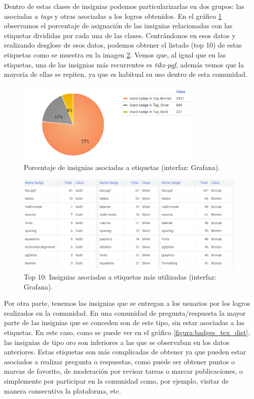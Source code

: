 \documentclass[a4paper, 12pt]{book}
\begin{document}
Dentro de estas clases de insignias podemos particularizarlas en dos grupos: las asociadas a \emph{tags} y otras asociadas a los logros obtenidos. En el gráfico \ref{figura:badges_tag_tex_dist} observamos el porcentaje de asignación de las insignias relacionadas con las etiquetas divididas por cada una de las clases. Centrándonos en esos datos y realizando desglose de esos datos, podemos obtener el listado (top 10) de estas etiquetas como se muestra en la imagen \ref{figura:badges_tags_data_tex}. Vemos que, al igual que en las etiquetas, una de las insignias más recurrentes es \emph{tikz-pgf}, además vemos que la mayoría de ellas se repiten, ya que es habitual su uso dentro de esta comunidad.

\begin{figure}[ht]
    \centering
    \includegraphics[width=0.8\textwidth]{img/tex/Badges_tag_tex_dist.png}
    \caption{Porcentaje de insignias asociadas a etiquetas (interfaz: Grafana).}
    \label{figura:badges_tag_tex_dist}
\end{figure}

\begin{figure}[ht]
    \centering
    \includegraphics[width=\textwidth]{img/tex/Badges_tag_tex_data.png}
    \caption{Top 10: Insignias asociadas a etiquetas más utilizadas (interfaz: Grafana).}
    \label{figura:badges_tags_data_tex}
\end{figure}

Por otra parte, tenemos las insignias que se entregan a los usuarios por los logros realizados en la comunidad. En una comunidad de pregunta/respuesta la mayor parte de las insignias que se conceden son de este tipo, sin estar asociadas a las etiquetas. En este caso, como se puede ver en el gráfico \ref{figura:badges_tex_dist}, las insignias de tipo oro son inferiores a las que se observaban en los datos anteriores. Estas etiquetas son más complicadas de obtener ya que pueden estar asociados a realizar pregunta o respuestas, como puede ser obtener puntos  o marcas de favorito, de moderación por revisar tareas o marcar publicaciones, o simplemente por participar en la comunidad como, por ejemplo, visitar de manera consecutiva la plataforma, etc. 
\end{document}
